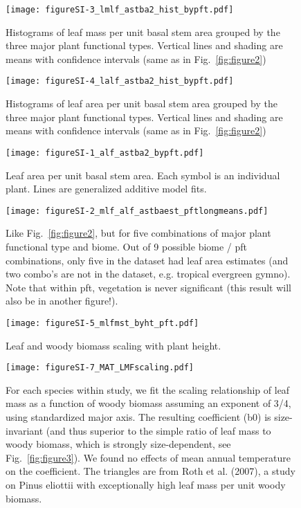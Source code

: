 \documentclass[a4paper]{article}\usepackage[]{graphicx}\usepackage[]{color}
\begin{document}
\begin{figure}[h!]
    \centering
    \texttt{[image: figureSI-3\_lmlf\_astba2\_hist\_bypft.pdf]}
    \caption{Histograms of leaf mass per unit basal stem area grouped by the three major plant functional types. Vertical lines and shading are means with confidence intervals (same as in Fig.~\ref{fig:figure2})}
    \label{fig:figureSI3}
\end{figure}

\begin{figure}[h!]
    \centering
    \texttt{[image: figureSI-4\_lalf\_astba2\_hist\_bypft.pdf]}
    \caption{Histograms of leaf area per unit basal stem area grouped by the three major plant functional types. Vertical lines and shading are means with confidence intervals (same as in Fig.~\ref{fig:figure2})}
    \label{fig:figureSI4}
\end{figure}


\begin{figure}[h!]
    \centering
    \texttt{[image: figureSI-1\_alf\_astba2\_bypft.pdf]}
    \caption{Leaf area per unit basal stem area. Each symbol is an individual plant. Lines are generalized additive model fits.}
    \label{fig:figureSI1}
\end{figure}

\begin{figure}[h!]
    \centering
    \texttt{[image: figureSI-2\_mlf\_alf\_astbaest\_pftlongmeans.pdf]}
    \caption{Like Fig.~\ref{fig:figure2}, but for five combinations of major plant functional type and biome. Out of 9 possible biome / pft combinations, only five in the dataset had leaf area estimates (and two combo's are not in the dataset, e.g. tropical evergreen gymno). Note that within pft, vegetation is never significant (this result will also be in another figure!).}
    \label{fig:figureSI2}
\end{figure}


\begin{figure}[h!]
    \centering
    \texttt{[image: figureSI-5\_mlfmst\_byht\_pft.pdf]}
    \caption{Leaf and woody biomass scaling with plant height.}
    \label{fig:figureSI5}
\end{figure}

\begin{figure}[h!]
    \centering
    \texttt{[image: figureSI-7\_MAT\_LMFscaling.pdf]}
    \caption{For each species within study, we fit the scaling relationship of leaf mass as a function of woody biomass assuming an exponent of 3/4, using standardized major axis. The resulting coefficient (b0) is size-invariant (and thus superior to the simple ratio of leaf mass to woody biomass, which is strongly size-dependent, see Fig.~\ref{fig:figure3}). We found no effects of mean annual temperature on the coefficient. The triangles are from Roth et al. (2007), a study on Pinus eliottii with exceptionally high leaf mass per unit woody biomass.}
    \label{fig:figureSI7}
\end{figure}




\clearpage

\end{document}
